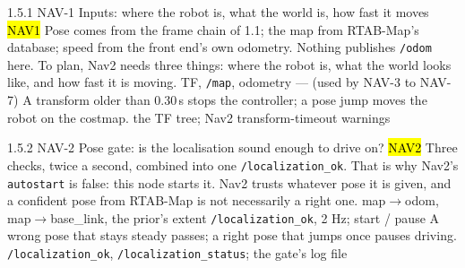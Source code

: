 \begin{frame}{1.5.1 \;NAV-1 \;Inputs: where the robot is, what the world is, how fast it moves}
  \hl{NAV1}
  {Pose comes from the frame chain of 1.1; the map from RTAB-Map's database;
   speed from the front end's own odometry. Nothing publishes \texttt{/odom} here.}
  {To plan, Nav2 needs three things: where the robot is, what the world looks
   like, and how fast it is moving.}
  {TF, \texttt{/map}, odometry}
  {--- (used by NAV-3 to NAV-7)}
  {A transform older than 0.30\,s stops the controller; a pose jump moves the robot on the costmap.}
  {the TF tree; Nav2 transform-timeout warnings}
\end{frame}

\begin{frame}{1.5.2 \;NAV-2 \;Pose gate: is the localisation sound enough to drive on?}
  \hl{NAV2}
  {Three checks, twice a second, combined into one \texttt{/localization\_ok}.
   That is why Nav2's \texttt{autostart} is false: this node starts it.}
  {Nav2 trusts whatever pose it is given, and a confident pose from RTAB-Map is
   not necessarily a right one.}
  {map$\rightarrow$odom, map$\rightarrow$base\_link, the prior's extent}
  {\texttt{/localization\_ok}, 2 Hz; start / pause}
  {A wrong pose that stays steady passes; a right pose that jumps once pauses driving.}
  {\texttt{/localization\_ok}, \texttt{/localization\_status}; the gate's log file}
\end{frame}

